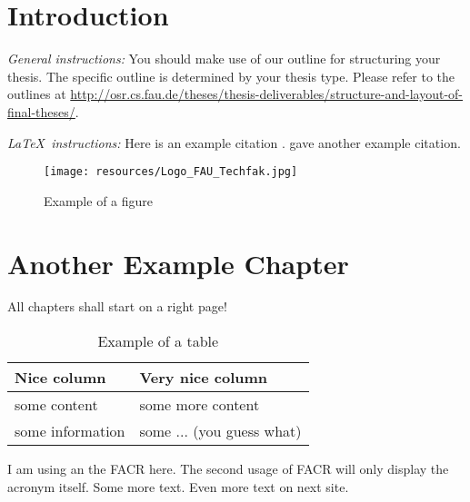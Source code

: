 \chapter{Introduction}
\label{chapter:example}

{\textsl{General instructions:}} 
You should make use of our outline for structuring your
thesis. The specific outline is determined by your thesis type.
Please refer to the outlines at 
\url{http://osr.cs.fau.de/theses/thesis-deliverables/structure-and-layout-of-final-theses/}.

{\textsl{\LaTeX\ instructions:}} Here is an example citation
\autocite{riehle:2011:controlling}.
\textcite{riehle:2007:economic} gave another example citation.

\begin{figure}
    \texttt{[image: resources/Logo\_FAU\_Techfak.jpg]}
    \caption{Example of a figure} 
    \label{fig:example}
\end{figure}


\chapter{Another Example Chapter}
\label{cahpter:another-example}

All chapters shall start on a right page!

\begin{table}
    \caption{Example of a table}
    \label{tab:example}
    \begin{tabular}{|l|l|}
        \hline
        Nice column &  Very nice column\\
        \hline
        some content & some more content \\
        some information & some ... (you guess what) \\
        \hline
    \end{tabular}
\end{table}

I am using an the \ac{FACR} here. The second usage of \ac{FACR} will only display the acronym itself.
\newpage
Some more text.
\newpage
Even more text on next site.